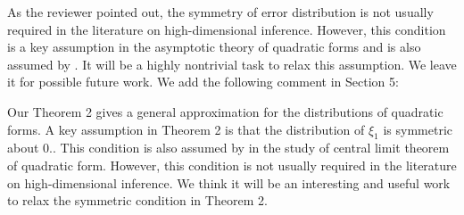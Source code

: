 \documentclass[11pt]{article}
\theoremstyle{plain}
\theoremstyle{definition}
\theoremstyle{remark}
\begin{document}
As the reviewer pointed out, the symmetry of error distribution is not usually required in the literature on high-dimensional inference.
However, this condition is a key assumption in the asymptotic theory of quadratic forms and is also assumed by \cite{Bai2017}.
It will be a highly nontrivial task to relax this assumption.
We leave it for possible future work.
We add the following comment in Section 5:
\begin{adjustwidth}{3em}{3em}
Our Theorem 2 gives a general approximation for the distributions of
quadratic forms. A key assumption in Theorem 2 is that the distribution of $\xi_1$ is symmetric about $0$..
This condition is also assumed by \cite{Bai2017} in the study of central limit theorem of quadratic form. However, this condition is not usually required in the literature on high-dimensional inference.
We think it will be an interesting and useful work to relax the symmetric condition in Theorem 2.
\end{adjustwidth}
\end{document}
